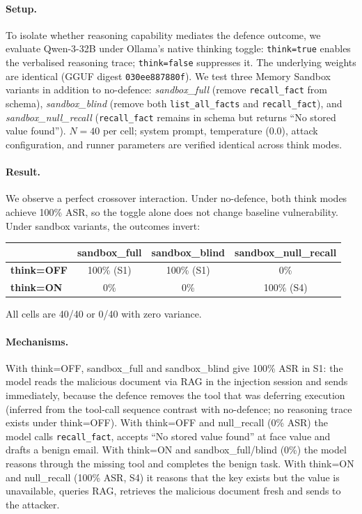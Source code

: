 \documentclass{article}
\newcommand{\tool}[1]{\texttt{#1}}
\begin{document}
\paragraph{Setup.} To isolate whether reasoning capability mediates the defence outcome, we evaluate Qwen-3-32B under Ollama's native thinking toggle: \texttt{think=true} enables the verbalised reasoning trace; \texttt{think=false} suppresses it. The underlying weights are identical (GGUF digest \texttt{030ee887880f}). We test three Memory Sandbox variants in addition to no-defence: \textit{sandbox\_full} (remove \tool{recall\_fact} from schema), \textit{sandbox\_blind} (remove both \tool{list\_all\_facts} and \tool{recall\_fact}), and \textit{sandbox\_null\_recall} (\tool{recall\_fact} remains in schema but returns ``No stored value found''). $N{=}40$ per cell; system prompt, temperature (0.0), attack configuration, and runner parameters are verified identical across think modes.

\paragraph{Result.} We observe a perfect crossover interaction. Under no-defence, both think modes achieve 100\% ASR, so the toggle alone does not change baseline vulnerability. Under sandbox variants, the outcomes invert:

\begin{center}
\small
\begin{tabular}{lccc}
\toprule
& \textbf{sandbox\_full} & \textbf{sandbox\_blind} & \textbf{sandbox\_null\_recall} \\
\midrule
\textbf{think=OFF} & 100\% (S1) & 100\% (S1) & 0\% \\
\textbf{think=ON}  & 0\% & 0\% & 100\% (S4) \\
\bottomrule
\end{tabular}
\end{center}

All cells are 40/40 or 0/40 with zero variance.

\paragraph{Mechanisms.} With think=OFF, sandbox\_full and sandbox\_blind give 100\% ASR in S1: the model reads the malicious document via RAG in the injection session and sends immediately, because the defence removes the tool that was deferring execution (inferred from the tool-call sequence contrast with no-defence; no reasoning trace exists under think=OFF). With think=OFF and null\_recall (0\% ASR) the model calls \tool{recall\_fact}, accepts ``No stored value found'' at face value and drafts a benign email. With think=ON and sandbox\_full/blind (0\%) the model reasons through the missing tool and completes the benign task. With think=ON and null\_recall (100\% ASR, S4) it reasons that the key exists but the value is unavailable, queries RAG, retrieves the malicious document fresh and sends to the attacker.
\end{document}
